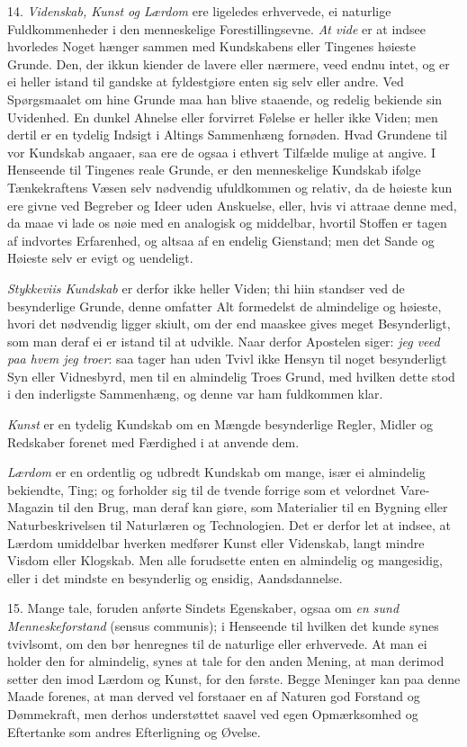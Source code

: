 \documentclass[12pt,a4paper]{article}
\newcommand{\opage}[1]{\marginnote{\footnotesize\textit{[#1]}}}
\begin{document}
14. \emph{Videnskab, Kunst og Lærdom} ere ligeledes erhvervede, ei naturlige
Fuldkommenheder i den menneskelige Forestillingsevne. \emph{At vide} er at indsee
hvorledes Noget hænger sammen med Kundskabens eller
\opage{186} Tingenes høieste Grunde. Den, der ikkun kiender de lavere eller nærmere, veed endnu intet,
og er ei heller istand til gandske at fyldestgiøre enten sig selv eller andre. Ved
Spørgsmaalet om hine Grunde maa han blive staaende, og redelig bekiende sin Uvidenhed. En
dunkel Ahnelse eller forvirret Følelse er heller ikke Viden; men dertil er en tydelig
Indsigt i Altings Sammenhæng fornøden. Hvad Grundene til vor Kundskab angaaer, saa ere de
ogsaa i ethvert Tilfælde mulige at angive. I Henseende til Tingenes reale Grunde, er den
menneskelige Kundskab ifølge Tænkekraftens Væsen selv nødvendig ufuldkommen og relativ, da
de høieste kun ere givne ved Begreber og Ideer uden Anskuelse, eller, hvis vi attraae
denne med, da maae vi lade os nøie med en analogisk og middelbar, hvortil Stoffen er tagen
af indvortes Erfarenhed, og altsaa af en endelig Gienstand; men det Sande og Høieste selv
er evigt og uendeligt.

\emph{Stykkeviis Kundskab} er derfor ikke heller Viden; thi hiin standser ved de
besynderlige Grunde, denne omfatter Alt formedelst de almindelige og høieste, hvori det
nødvendig ligger skiult, om der end maaskee gives meget Besynderligt, som man deraf ei er
istand til at udvikle. Naar derfor Apostelen siger: \emph{jeg veed paa hvem jeg troer}:
saa tager han uden Tvivl ikke Hensyn til noget besynderligt Syn eller Vidnesbyrd, men til
en almindelig Troes Grund, med hvilken dette stod
\opage{187} i den inderligste Sammenhæng, og denne var ham fuldkommen klar.

\emph{Kunst} er en tydelig Kundskab om en Mængde besynderlige Regler, Midler og Redskaber
forenet med Færdighed i at anvende dem.

\emph{Lærdom} er en ordentlig og udbredt Kundskab om mange, især ei almindelig bekiendte,
Ting; og forholder sig til de tvende forrige som et velordnet Vare-Magazin til den Brug,
man deraf kan giøre, som Materialier til en Bygning eller Naturbeskrivelsen til Naturlæren
og Technologien. Det er derfor let at indsee, at Lærdom umiddelbar hverken medfører Kunst
eller Videnskab, langt mindre Visdom eller Klogskab. Men alle forudsette enten en
almindelig og mangesidig, eller i det mindste en besynderlig og ensidig, Aandsdannelse.

15. Mange tale, foruden anførte Sindets Egenskaber, ogsaa om \emph{en sund
Menneskeforstand} (sensus communis); i Henseende til hvilken det kunde synes tvivlsomt, om
den bør henregnes til de naturlige eller erhvervede. At man ei holder den for almindelig,
synes at tale for den anden Mening, at man derimod setter den imod Lærdom og Kunst, for
den første. Begge Meninger kan paa denne Maade forenes, at man derved vel forstaaer en af
Naturen god Forstand og Dømmekraft, men derhos understøttet saavel ved egen Opmærksomhed
og Eftertanke som andres Efterligning og Øvelse.
\end{document}
